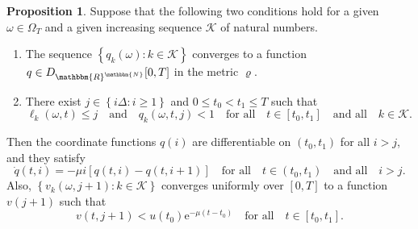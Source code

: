 \documentclass[a4paper, 12pt]{article}
\theoremstyle{definition}
\newtheorem{proposition}[theorem]{Proposition}
\newcommand{\set}[2]{\left\{#1 : #2\right\}}
\newcommand{\calK}{\mathcal{K}}
\newcommand{\N}{\mathbbm{N}}
\newcommand{\R}{\mathbbm{R}}
\newcommand{\e}{\mathrm{e}}
\begin{document}
\begin{proposition}
	\label{prop: tail number of tasks}
	Suppose that the following two conditions hold for a given $\omega \in \Omega_T$ and a given increasing sequence $\calK$ of natural numbers.
	\begin{enumerate}
		\item[(a)] The sequence $\set{q_k(\omega)}{k \in \calK}$ converges to a function $q \in D_{\R^\N}[0, T]$ in the metric $\varrho$.
		
		\item[(b)] There exist $j \in \set{i\Delta}{i \geq 1}$ and $0 \leq t_0 < t_1 \leq T$ such that
		\begin{equation*}
			\ell_k(\omega, t) \leq j \quad \text{and} \quad q_k(\omega, t, j) < 1 \quad \text{for all} \quad t \in [t_0, t_1] \quad \text{and all} \quad k \in \calK.
		\end{equation*}
	\end{enumerate}
	Then the coordinate functions $q(i)$ are differentiable on $(t_0, t_1)$ for all $i > j$, and they satisfy
	\begin{equation*}
		\dot{q}(t, i) = -\mu i \left[q(t, i) - q(t, i + 1)\right] \quad \text{for all} \quad t \in (t_0, t_1) \quad \text{and all} \quad i > j.
	\end{equation*}
	Also, $\set{v_k(\omega, j + 1)}{k \in \calK}$ converges uniformly over $[0, T]$ to a function $v(j + 1)$ such that
	\begin{equation*}
		v(t, j + 1) < u(t_0)\e^{-\mu (t - t_0)} \quad \text{for all} \quad t \in [t_0, t_1].
	\end{equation*} 
\end{proposition}
\end{document}
